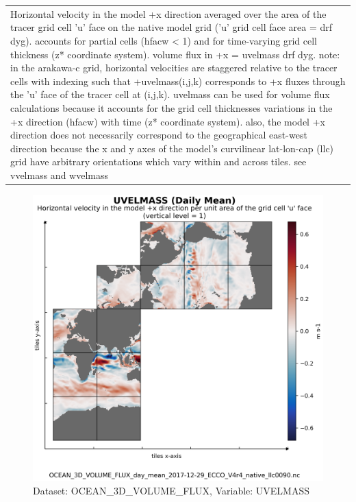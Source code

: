 \begin{longtable}{|m{}|m{}|m{}|m{}|}
\rowcolor{lightgray} \multicolumn{4}{|c|}{\textbf{Comments}} \\ \hline
\multicolumn{4}{|p{1\textwidth}|}{\footnotesize{{Horizontal velocity in the model +x direction averaged over the area of the tracer grid cell 'u' face on the native model grid ('u' grid cell face area = drf dyg). accounts for partial cells (hfacw < 1) and for time-varying grid cell thickness (z* coordinate system). volume flux in +x = uvelmass drf dyg. note: in the arakawa-c grid, horizontal velocities are staggered relative to the tracer cells with indexing such that +uvelmass(i,j,k) corresponds to +x fluxes through the 'u' face of the tracer cell at (i,j,k). uvelmass can be used for volume flux calculations because it accounts for the grid cell thicknesses variations in the +x direction (hfacw) with time (z* coordinate system). also, the model +x direction does not necessarily correspond to the geographical east-west direction because the x and y axes of the model's curvilinear lat-lon-cap (llc) grid have arbitrary orientations which vary within and across tiles. see vvelmass and wvelmass}}} \\ \hline
\end{longtable}

\begin{figure}[H]
\centering
\includegraphics[scale=0.55]{../images/plots/v4r4/native_plots/Ocean_Three-Dimensional_Volume_Fluxes/UVELMASS.png}
\caption{Dataset: OCEAN\_3D\_VOLUME\_FLUX, Variable: UVELMASS}
\label{tab:table-OCEAN_3D_VOLUME_FLUX_UVELMASS-Plot}
\end{figure}
\newpage
\pagebreak
